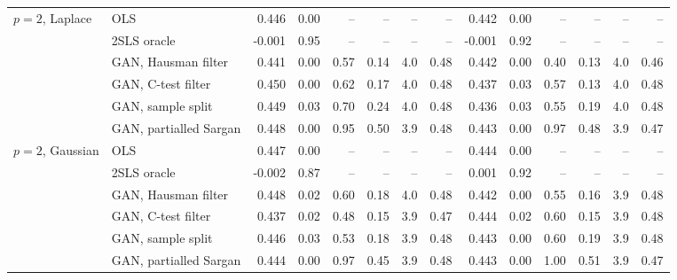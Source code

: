 \begin{table}[p]
\begin{tabular}{@{}llrrrrrrrrrrrr@{}}
\addlinespace
$p=2$, Laplace & OLS & 0.446 & 0.00 & -- & -- & -- & -- & 0.442 & 0.00 & -- & -- & -- & -- \\
 & 2SLS oracle & -0.001 & 0.95 & -- & -- & -- & -- & -0.001 & 0.92 & -- & -- & -- & -- \\
 & GAN, Hausman filter & 0.441 & 0.00 & 0.57 & 0.14 & 4.0 & 0.48 & 0.442 & 0.00 & 0.40 & 0.13 & 4.0 & 0.46 \\
 & GAN, C-test filter & 0.450 & 0.00 & 0.62 & 0.17 & 4.0 & 0.48 & 0.437 & 0.03 & 0.57 & 0.13 & 4.0 & 0.48 \\
 & GAN, sample split & 0.449 & 0.03 & 0.70 & 0.24 & 4.0 & 0.48 & 0.436 & 0.03 & 0.55 & 0.19 & 4.0 & 0.48 \\
 & GAN, partialled Sargan & 0.448 & 0.00 & 0.95 & 0.50 & 3.9 & 0.48 & 0.443 & 0.00 & 0.97 & 0.48 & 3.9 & 0.47 \\
\addlinespace
$p=2$, Gaussian & OLS & 0.447 & 0.00 & -- & -- & -- & -- & 0.444 & 0.00 & -- & -- & -- & -- \\
 & 2SLS oracle & -0.002 & 0.87 & -- & -- & -- & -- & 0.001 & 0.92 & -- & -- & -- & -- \\
 & GAN, Hausman filter & 0.448 & 0.02 & 0.60 & 0.18 & 4.0 & 0.48 & 0.442 & 0.00 & 0.55 & 0.16 & 3.9 & 0.48 \\
 & GAN, C-test filter & 0.437 & 0.02 & 0.48 & 0.15 & 3.9 & 0.47 & 0.444 & 0.02 & 0.60 & 0.15 & 3.9 & 0.48 \\
 & GAN, sample split & 0.446 & 0.03 & 0.53 & 0.18 & 3.9 & 0.48 & 0.443 & 0.00 & 0.60 & 0.19 & 3.9 & 0.48 \\
 & GAN, partialled Sargan & 0.444 & 0.00 & 0.97 & 0.45 & 3.9 & 0.48 & 0.443 & 0.00 & 1.00 & 0.51 & 3.9 & 0.47 \\
\bottomrule
\end{tabular}
\end{table}
